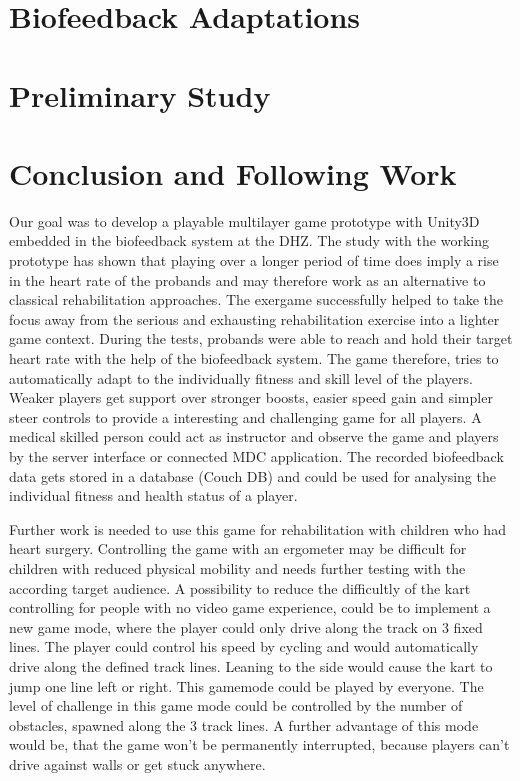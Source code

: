 \begin{multicols}{2}
\section{Biofeedback Adaptations}

\section{Preliminary Study}

\section{Conclusion and Following Work}
Our goal was to develop a playable multilayer game prototype with Unity3D embedded in the biofeedback system at the DHZ. The study with the working prototype has shown that playing over a longer period of time does imply a rise in the heart rate of the probands and may therefore work as an alternative to classical rehabilitation approaches. The exergame successfully helped to take the focus away from the serious and exhausting rehabilitation exercise into a lighter game context. During the tests, probands were able to reach and hold their target heart rate with the help of the biofeedback system. The game therefore, tries to automatically adapt to the individually fitness and skill level of the players. Weaker players get support over stronger boosts, easier speed gain and simpler steer controls to provide a interesting and challenging game for all players. A medical skilled person could act as instructor and observe the game and players by the server interface or connected MDC application. The recorded biofeedback data gets stored in a database (Couch DB) and could be used for analysing the individual fitness and health status of a player.

Further work is needed to use this game for rehabilitation with children who had heart surgery. Controlling the game with an ergometer may be difficult for children with reduced physical mobility and needs further testing with the according target audience. A possibility to reduce the difficultly of the kart controlling for people with no video game experience, could be to implement a new game mode, where the player could only drive along the track on 3 fixed lines. The player could control his speed by cycling and would automatically drive along the defined track lines. Leaning to the side would cause the kart to jump one line left or right. This gamemode could be played by everyone. The level of challenge in this game mode could be controlled by the number of obstacles, spawned along the 3 track lines. A further advantage of this mode would be, that the game won't be permanently interrupted, because players can't drive against walls or get stuck anywhere.


\end{multicols}
